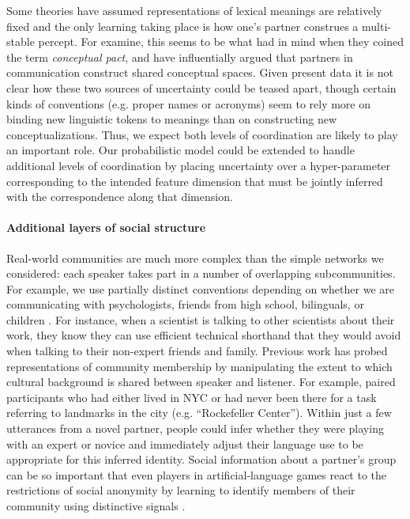 Some theories have assumed representations of lexical meanings are relatively fixed and the only learning taking place is how one's partner construes a multi-stable percept. 
For examine, this seems to be what  had in mind when they coined the term \emph{conceptual pact}, and \cite{stolk2016conceptual} have influentially argued that partners in communication construct shared conceptual spaces. 
Given present data it is not clear how these two sources of uncertainty could be teased apart, though certain kinds of conventions (e.g. proper names or acronyms) seem to rely more on binding new linguistic tokens to meanings than on constructing new conceptualizations.
Thus, we expect both levels of coordination are likely to play an important role. 
Our probabilistic model could be extended to handle additional levels of coordination by placing uncertainty over a hyper-parameter corresponding to the intended feature dimension that must be jointly inferred with the correspondence along that dimension. 


\paragraph{Additional layers of social structure}

Real-world communities are much more complex than the simple networks we considered: each speaker takes part in a number of overlapping subcommunities. 
For example, we use partially distinct conventions depending on whether we are communicating with psychologists, friends from high school, bilinguals, or children \cite{auer_code-switching_2013}.
For instance, when a scientist is talking to other scientists about their work, they know they can use efficient technical shorthand that they would avoid when talking to their non-expert friends and family. 
Previous work has probed representations of community membership by manipulating the extent to which cultural background is shared between speaker and listener.
For example,  paired participants who had either lived in NYC or had never been there for a task referring to landmarks in the city (e.g. ``Rockefeller Center''). 
Within just a few utterances from a novel partner, people could infer whether they were playing with an expert or novice and immediately adjust their language use to be appropriate for this inferred identity. 
Social information about a partner’s group can be so important that even players in artificial-language games react to the restrictions of social anonymity by learning to identify members of their community using distinctive signals \cite{roberts_experimental_2010}.

